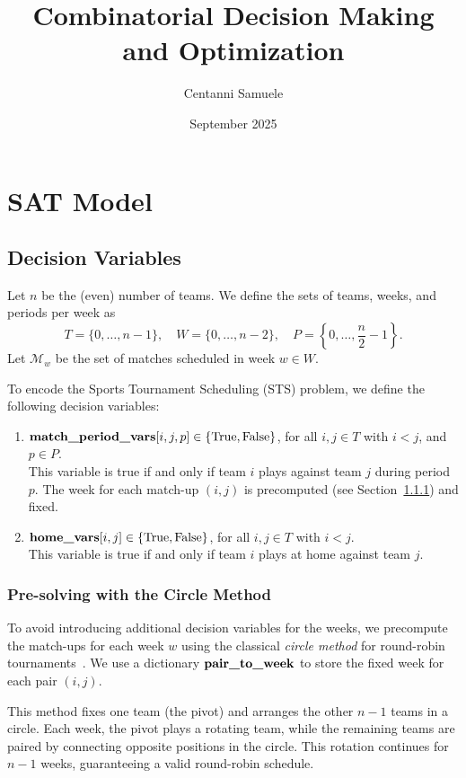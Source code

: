 \documentclass{article}
\title{Combinatorial Decision Making and Optimization}
\author{Centanni Samuele}
\date{September 2025}
\begin{document}



\section{SAT Model}

\subsection{Decision Variables}
Let $n$ be the (even) number of teams. We define the sets of teams, weeks, and periods per week as
\[
T = \{0, \dots, n-1\}, \quad W = \{0, \dots, n-2\}, \quad P = \left\{0, \dots, \frac{n}{2} - 1\right\}.
\]
Let $\mathcal{M}_w$ be the set of matches scheduled in week $w \in W$.

To encode the Sports Tournament Scheduling (STS) problem, we define the following decision variables:
\begin{enumerate}
    \item $\text{\textbf{match\_period\_vars}}[i,j,p] \in \{\mathrm{True}, \mathrm{False}\}$, for all $i,j \in T$ with $i < j$, and $p \in P$. \\
    This variable is true if and only if team $i$ plays against team $j$ during period $p$. The week for each match-up $(i,j)$ is precomputed (see Section~\ref{sec:CircleMatching}) and fixed.
    
    \item $\text{\textbf{home\_vars}}[i,j] \in \{\mathrm{True}, \mathrm{False}\}$, for all $i,j \in T$ with $i < j$. \\
    This variable is true if and only if team $i$ plays at home against team $j$.
\end{enumerate}

\subsubsection{Pre-solving with the Circle Method}
\label{sec:CircleMatching}
To avoid introducing additional decision variables for the weeks, we precompute the match-ups for each week $w$ using the classical \emph{circle method} for round-robin tournaments~\cite{dewerra1999}. We use a dictionary $\text{\textbf{pair\_to\_week}}$ to store the fixed week for each pair $(i,j)$.

This method fixes one team (the pivot) and arranges the other $n-1$ teams in a circle. Each week, the pivot plays a rotating team, while the remaining teams are paired by connecting opposite positions in the circle. This rotation continues for $n-1$ weeks, guaranteeing a valid round-robin schedule.
\end{document}
